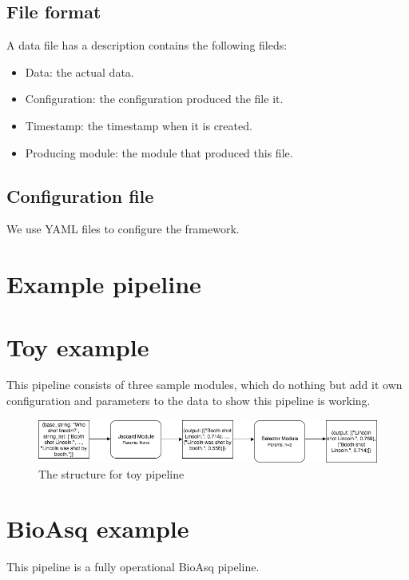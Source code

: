 \documentclass{article}
\begin{document}
    \subsection{File format}
    A data file has a description contains the following fileds:
    \begin{itemize}
        \item Data: the actual data.
        \item Configuration: the configuration produced the file it.
        \item Timestamp: the timestamp when it is created.
        \item Producing module: the module that produced this file.
    \end{itemize}


    \subsection{Configuration file}
    We use YAML files to configure the framework.


\section{Example pipeline}
    \section{Toy example}
    This pipeline consists of three sample modules,
    which do nothing but add it own configuration and parameters to the data to show this pipeline is working.

    \begin{figure}[H]
        \begin{center}
            \includegraphics[width=\textwidth]{fig/toy_pipeline.png}
        \end{center}
        \label{fig:toy_pipeline}
        \caption{The structure for toy pipeline}
    \end{figure}


    \section{BioAsq example}
    This pipeline is a fully operational BioAsq pipeline.
\end{document}
